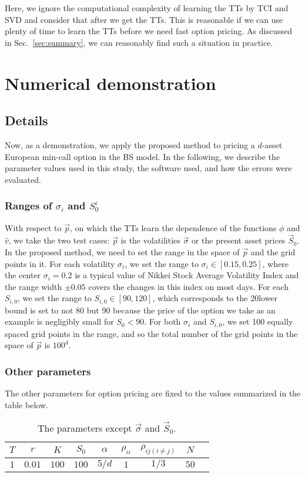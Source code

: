 Here, we ignore the computational complexity of learning the TTs by TCI and SVD and consider that after we get the TTs. 
This is reasonable if we can use plenty of time to learn the TTs before we need fast option pricing.
As discussed in Sec.~\ref{sec:summary}, we can reasonably find such a situation in practice.


\section{Numerical demonstration}\label{sec:demo}
\subsection{Details}
Now, as a demonstration, we apply the proposed method to pricing a $d$-asset European min-call option in the BS model.
In the following, we describe the parameter values used in this study, the software used, and how the errors were evaluated.

\subsubsection*{Ranges of ${\sigma_i}$ and ${S^i_0}$}
With respect to $\vec{p}$, on which the TTs learn the dependence of the functions $\phi$ and $\hat{v}$, we take the two test cases: $\vec{p}$ is the volatilities $\vec{\sigma}$ or the present asset prices $\vec{S}_0$. 
In the proposed method, we need to set the range in the space of $\vec{p}$ and the grid points in it.
For each volatility $\sigma_i$, we set the range to $\sigma_i \in [0.15, 0.25]$, where the center $\sigma_i=0.2$ is a typical value of Nikkei Stock Average Volatility Index \cite{nikkei_vi} and the range width $\pm 0.05$ covers the changes in this index on most days.
For each $S_{i,0}$, we set the range to $S_{i,0} \in [90, 120]$, which corresponds to the 20\The lower bound is set to not 80 but 90 because the price of the option we take as an example is negligibly small for $S_0 < 90$.
For both $\sigma_i$ and $S_{i,0}$, we set 100 equally spaced grid points in the range, and so the total number of the grid points in the space of $\vec{p}$ is $100^d$.

\subsubsection*{Other parameters}
The other parameters for option pricing are fixed to the values summarized in the table below.
\begin{table}[hbtp]
\centering
\begin{tabular}{|c|c|c|c|c|c|c|c|c|}
    \hline
    $T$ & $r$ & $K$ &$S_0$ & $\alpha$ & $\rho_{ii}$ & $\rho_{ij(i\ne j)}$ & $N$ \\
    \hline
    $1$ & $0.01$ & $100$ &$100$ & $5/d$ & $1$ & $1/3$ & $50$  \\
    \hline
\end{tabular}
\caption{The parameters except $\vec{\sigma}$ and $\vec{S}_0$.}
\label{tab:tt_1d_table}
\end{table}

